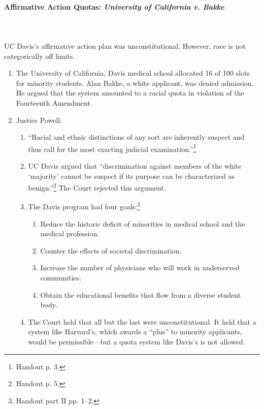 \paragraph{Affirmative Action Quotas: \emph{University of California v. 
Bakke}}
~\\\\
UC Davis's affirmative action plan was unconstitutional. However, race is not 
categorically off limits.

\begin{enumerate}
    \item The University of California, Davis medical school allocated 16 of 
    100 slots for minority students. Alan Bakke, a white applicant, was denied 
    admission. He argued that the system amounted to a racial quota in 
    violation of the Fourteenth Amendment.
    \item Justice Powell:
    \begin{enumerate}
        \item ``Racial and ethnic distinctions of any sort are inherently 
        suspect and thus call for the most exacting judicial 
        examination.''\footnote{Handout p. 3.}
        \item UC Davis argued that ``discrimination against members of the 
        white `majority' cannot be suspect if its purpose can be characterized 
        as benign.''\footnote{Handout p. 5.} The Court rejected this argument.
        \item The Davis program had four goals:\footnote{Handout part II pp. 
        1--2.}
        \begin{enumerate}
            \item Reduce the historic deficit of minorities in medical school 
            and the medical profession.
            \item Counter the effects of societal discrimination.
            \item Increase the number of physicians who will work in 
            underserved communities.
            \item Obtain the educational benefits that flow from a diverse 
            student body.
        \end{enumerate}
        \item The Court held that all but the last were unconstitutional. It 
        held that a system like Harvard's, which awards a ``plus'' to minority 
        applicants, would be permissible---but a quota system like Davis's is 
        not allowed.
    \end{enumerate}

\end{enumerate}
